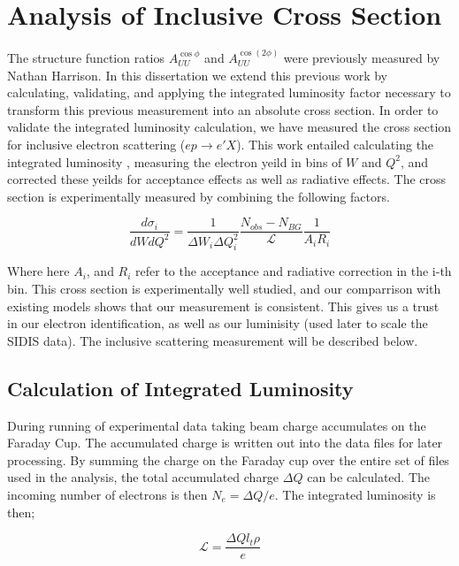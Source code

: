 \section{Analysis of Inclusive Cross Section}

The structure function ratios $A_{UU}^{\cos\phi}$ and $A_{UU}^{\cos(2\phi)}$ were previously measured by Nathan Harrison.  In this dissertation we extend this previous work by calculating, validating, and applying the integrated luminosity factor necessary to transform this previous measurement into an absolute cross section.  In order to validate the integrated luminosity calculation, we have measured the cross section for inclusive electron scattering ($ep \rightarrow e'X$).  This work entailed calculating the integrated luminosity \cite{fcup-note}, measuring the electron yeild in bins of $W$ and $Q^2$, and corrected these yeilds for acceptance effects as well as radiative effects.  The cross section is experimentally measured by combining the following factors. 

\begin{equation}
  \frac{d\sigma_i}{dW dQ^2} = \frac{1}{\Delta W_i \Delta Q^2_i} \frac{N_{obs} - N_{BG}}{\mathcal{L}} \frac{1}{A_i R_i}
\end{equation}

Where here $A_i$, and $R_i$ refer to the acceptance and radiative correction in the i-th bin.  This cross section is experimentally well studied, and our comparrison with existing models shows that our measurement is consistent.  This gives us a trust in our electron identification, as well as our luminisity (used later to scale the SIDIS data).  The inclusive scattering measurement will be described below.

\subsection{Calculation of Integrated Luminosity}
During running of experimental data taking beam charge accumulates on the Faraday Cup.  The accumulated charge is written out into the data files for later processing.  By summing the charge on the Faraday cup over the entire set of files used in the analysis, the total accumulated charge $\Delta Q$ can be calculated.  The incoming number of electrons is then $N_e = \Delta Q/e $.  The integrated luminosity is then; 

\begin{equation}
  \mathcal{L} = \frac{\Delta Q l_t \rho}{e}
\end{equation}

